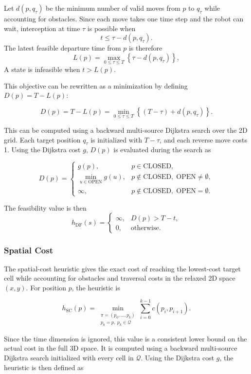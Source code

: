\documentclass[11pt]{article}
\begin{document}
Let \(d(p,q_\tau)\) be the minimum number of valid moves from \(p\) to \(q_\tau\) while accounting for obstacles. Since each move takes one time step and the robot can wait, interception at time \(\tau\) is possible when
\[
  t\leq \tau-d(p,q_\tau).
\]
The latest feasible departure time from \(p\) is therefore
\[
  L(p)=\max_{0\leq \tau\leq T}
  \left\{\tau-d(p,q_\tau)\right\},
\]
A state is infeasible when \(t>L(p)\).

This objective can be rewritten as a minimization by defining \(D(p)=T-L(p)\):

\[
  D(p)=T-L(p)
  =\min_{0\leq \tau\leq T}
  \left\{(T-\tau)+d(p,q_\tau)\right\}.
\]

This can be computed using a backward multi-source Dijkstra search over the 2D grid. Each target position \(q_\tau\) is initialized with \(T-\tau\), and each reverse move costs 1. Using the Dijkstra cost \(g\), \(D(p)\) is evaluated during the search as

\[
  D(p)=
  \begin{cases}
    g(p),   & p\in\mathrm{CLOSED},                                 \\
    \displaystyle\min_{u\in\mathrm{OPEN}}g(u),
            & p\notin\mathrm{CLOSED},\;\mathrm{OPEN}\neq\emptyset, \\
    \infty, & p\notin\mathrm{CLOSED},\;\mathrm{OPEN}=\emptyset.
  \end{cases}
\]

The feasibility value is then
\[
  h_{\mathrm{DF}}(s)=
  \begin{cases}
    \infty, & D(p)>T-t,         \\
    0,      & \text{otherwise}.
  \end{cases}
\]

\subsubsection{Spatial Cost}
The spatial-cost heuristic gives the exact cost of reaching the lowest-cost target cell while accounting for obstacles and traversal costs in the relaxed 2D space \((x,y)\). For position \(p\), the heuristic is

\[
  h_{\mathrm{SC}}(p)
  =
  \min_{\substack{\pi=(p_0,\ldots,p_k)\\p_0=p,\;p_k\in\mathcal{Q}}}
  \sum_{i=0}^{k-1} c(p_i,p_{i+1}).
\]

Since the time dimension is ignored, this value is a consistent lower bound on the actual cost in the full 3D space. It is computed using a backward multi-source Dijkstra search initialized with every cell in \(\mathcal{Q}\). Using the Dijkstra cost \(g\), the heuristic is then defined as
\end{document}
